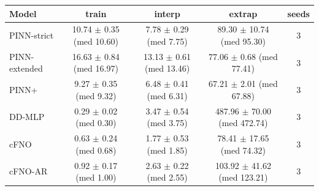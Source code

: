 \begin{tabular}{lcccc}
\toprule
Model & train & interp & extrap & seeds \\
\midrule
PINN-strict & 10.74 $\pm$ 0.35 (med 10.60) & 7.78 $\pm$ 0.29 (med 7.75) & 89.30 $\pm$ 10.74 (med 95.30) & 3 \\
PINN-extended & 16.63 $\pm$ 0.84 (med 16.97) & 13.13 $\pm$ 0.61 (med 13.46) & 77.06 $\pm$ 0.68 (med 77.41) & 3 \\
PINN+ & 9.27 $\pm$ 0.35 (med 9.32) & 6.48 $\pm$ 0.41 (med 6.31) & 67.21 $\pm$ 2.01 (med 67.88) & 3 \\
DD-MLP & 0.29 $\pm$ 0.02 (med 0.30) & 3.47 $\pm$ 0.54 (med 3.75) & 487.96 $\pm$ 70.00 (med 472.74) & 3 \\
cFNO & 0.63 $\pm$ 0.24 (med 0.68) & 1.77 $\pm$ 0.53 (med 1.85) & 78.41 $\pm$ 17.65 (med 74.32) & 3 \\
cFNO-AR & 0.92 $\pm$ 0.17 (med 1.00) & 2.63 $\pm$ 0.22 (med 2.55) & 103.92 $\pm$ 41.62 (med 123.21) & 3 \\
\bottomrule
\end{tabular}
